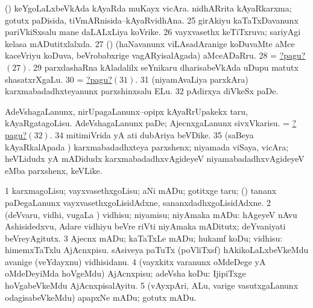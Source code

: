  (\rUpa) keYgoLaLxbeVkAda kAyaRda muKayx vicAra. 
 nidhARrita kAyaRkarxma; gotutx paDisida, tiVmARnisida--kAyaRvidhAna. 
\eanum
\numie
\num{25}  girAkiyu kaTaTxDavanunx pariVkiSxsalu mane daLALxLiya koVrike. 
\hypertarget{order1pagu26}{} 
\num{26}  vayxvasethx keTiTxruva; sariyAgi kelasa mADutitxlalxda. 
\hypertarget{order1pagu27}{} 
\num{27}  (\birx) (haNavanunx viLAsadAranige koDuvaMte aMce kaceVriyu koDuva, beVrobabxrige vagARyisalAgada) aMceADaRru. 
\num{28}  = \hyperlink{order1pagu27}{?pagu?\((27)\)}. 
\num{29}  parxdashaRna kAladalilx seYnikaru dharisabeVkAda uDupu matutx shasatxrXgaLu. 
\num{30}  = \hyperlink{order1pagu31}{?pagu?\((31)\)}. 
\hypertarget{order1pagu31}{} 
\num{31}  (niyamAvaLiya parxkAra) karxmabadadhxteyanunx parxshinxsalu ELu. 
\hypertarget{order1pagu32}{} 
\num{32}  pAdirxya diVkeSx paDe. 
  
\banum
{} AdeVshagaLanunx, nirUpagaLanunx--opipx kAyaRrUpakekx taru, kAyaRgatagoLisu. 
 AdeVshagaLanunx paDe; AjecnxgaLanunx sivxVkarisu. 
 = \hyperlink{order1pagu32}{?pagu?\((32)\)}. 
\eanum
\numie
\num{34}  mitimiVrida yA ati dubAriya beVDike. 
\num{35}  (saBeya kAyaRkalApada \vi) karxmabadadhxteya parxshenx; niyamada viSaya, vicAra; heVLidudx yA mADidudx karxmabadadhxvAgideyeV niyamabadadhxvAgideyeV eMba parxshenx, keVLike. 
\enum
\emng
\eentry

\bentry
{}
\gl{\sakirx}
\bmng
\bnum
\num{1} karxmagoLisu; vayxvasethxgoLisu; aNi mADu; gotitxge taru; (\pArxparx)  tananx paDegaLanunx vayxvasethxgoLisidAdxne, sananxdadhxgoLisidAdxne. 
\num{2} (deVvaru, vidhi, \mo vugaLa \vi) vidhisu; niyamisu; niyAmaka mADu:  hAgeyeV nAvu Ashisidedxvu, Adare vidhiyu beVre riVti niyAmaka mADitutx; deYvaniyati beVreyAgitutx. 
\num{3} Ajecnx mADu; kaTaTxLe mADu; hukamf koDu; vidhisu:  himemxTaTxlu AjAcnxpisu.  sAsiveya paTuTx (poVliTxsf) hAkikoLaLxbeVkeMdu avanige (veYdayxnu) vidhisidanu. 
\num{4} (vayxkitx \mo varanunx oMdeDege yA oMdeDeyiMda hoVgeMdu) AjAcnxpisu; adeVsha koDu:  IjipiTxge hoVgabeVkeMdu AjAcnxpisalAyitu. 
\num{5} (vAyxpAri, ALu, \mo varige vasutxgaLanunx odagisabeVkeMdu) apapxNe mADu; gotutx mADu. 
\enum
\emng

